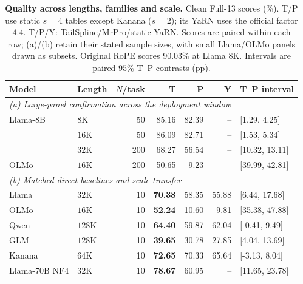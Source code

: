 \begin{table}[ht]
\centering\small
\caption{\textbf{Quality across lengths, families and scale.} Clean Full-13 scores (\%). T/P use static $s=4$ tables except Kanana ($s=2$); its YaRN uses the official factor $4.4$. T/P/Y: TailSpline/MrPro/static YaRN. Scores are paired within each row; (a)/(b) retain their stated sample sizes, with small Llama/OLMo panels drawn as subsets. Original RoPE scores $90.03\%$ at Llama $8$K. Intervals are paired $95\%$ T--P contrasts (pp).}
\label{tab:clean-length-main}
\begin{tabular}{@{}llrrrrl@{}}
\toprule
Model & Length & $N$/task & T & P & Y & T--P interval \\
\midrule
\multicolumn{7}{l}{\emph{(a) Large-panel confirmation across the deployment window}} \\
Llama-8B & $8$K & 50 & 85.16 & 82.39 & -- & [1.29, 4.25] \\
 & $16$K & 50 & 86.09 & 82.71 & -- & [1.53, 5.34] \\
 & $32$K & 200 & 68.27 & 56.54 & -- & [10.32, 13.11] \\
OLMo & $16$K & 200 & 50.65 & 9.23 & -- & [39.99, 42.81] \\
\midrule
\multicolumn{7}{l}{\emph{(b) Matched direct baselines and scale transfer}} \\
Llama & $32$K & 10 & \textbf{70.38} & 58.35 & 55.88 & [6.44, 17.68] \\
OLMo & $16$K & 10 & \textbf{52.24} & 10.60 & 9.81 & [35.38, 47.88] \\
Qwen & $128$K & 10 & \textbf{64.40} & 59.87 & 62.04 & [-0.41, 9.49] \\
GLM & $128$K & 10 & \textbf{39.65} & 30.78 & 27.85 & [4.04, 13.69] \\
Kanana & $64$K & 10 & \textbf{72.65} & 70.33 & 65.64 & [-3.13, 8.04] \\
Llama-70B NF4 & $32$K & 10 & \textbf{78.67} & 60.95 & -- & [11.65, 23.78] \\
\bottomrule
\end{tabular}
\end{table}

